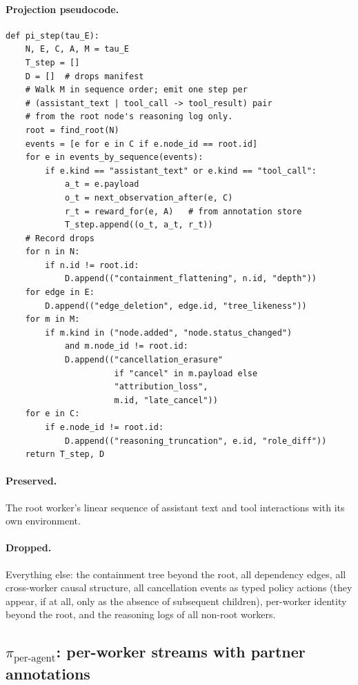 \documentclass{article}
\begin{document}
\paragraph{Projection pseudocode.}
\begin{lstlisting}
def pi_step(tau_E):
    N, E, C, A, M = tau_E
    T_step = []
    D = []  # drops manifest
    # Walk M in sequence order; emit one step per
    # (assistant_text | tool_call -> tool_result) pair
    # from the root node's reasoning log only.
    root = find_root(N)
    events = [e for e in C if e.node_id == root.id]
    for e in events_by_sequence(events):
        if e.kind == "assistant_text" or e.kind == "tool_call":
            a_t = e.payload
            o_t = next_observation_after(e, C)
            r_t = reward_for(e, A)   # from annotation store
            T_step.append((o_t, a_t, r_t))
    # Record drops
    for n in N:
        if n.id != root.id:
            D.append(("containment_flattening", n.id, "depth"))
    for edge in E:
        D.append(("edge_deletion", edge.id, "tree_likeness"))
    for m in M:
        if m.kind in ("node.added", "node.status_changed")
            and m.node_id != root.id:
            D.append(("cancellation_erasure"
                      if "cancel" in m.payload else
                      "attribution_loss",
                      m.id, "late_cancel"))
    for e in C:
        if e.node_id != root.id:
            D.append(("reasoning_truncation", e.id, "role_diff"))
    return T_step, D
\end{lstlisting}

\paragraph{Preserved.} The root worker's linear sequence of
assistant text and tool interactions with its own environment.
\paragraph{Dropped.} Everything else: the containment tree beyond
the root, all dependency edges, all cross-worker causal structure,
all cancellation events as typed policy actions (they appear, if
at all, only as the absence of subsequent children), per-worker
identity beyond the root, and the reasoning logs of all
non-root workers.

\subsection{$\pi_{\text{per-agent}}$: per-worker streams with partner annotations}
\label{app:proj:per-agent}
\end{document}
